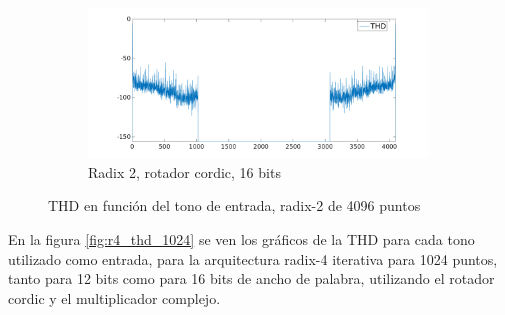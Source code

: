 \begin{figure}[htbp!]
\begin{subfigure}{0.6\textwidth}
        \includegraphics[width=9cm]{./figures/thd_r2_4096_16_cor.png}
        \caption{Radix 2, rotador cordic, 16 bits}
        \end{subfigure} 
        \caption{THD en función del tono de entrada, radix-2 de 4096 puntos}
        \label{fig:r2_thd_4096}
\end{figure}

En la figura \ref{fig:r4_thd_1024} se ven los gráficos de la THD para cada tono utilizado como
entrada, para la arquitectura radix-4 iterativa para 1024 puntos, tanto para 12 bits como para 16 bits de
ancho de palabra, utilizando el rotador cordic y el multiplicador complejo.

